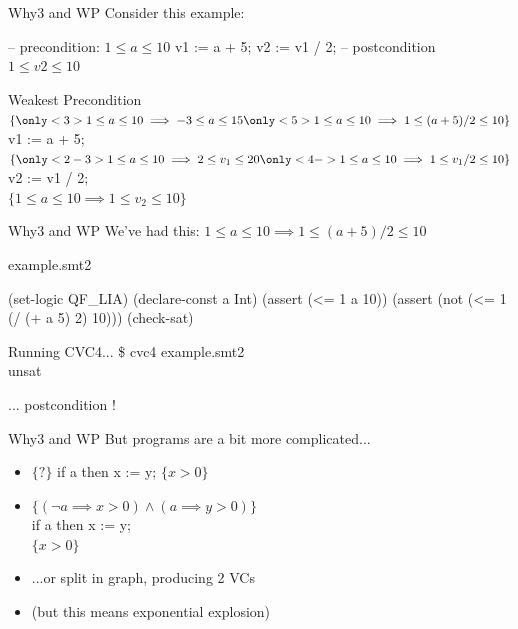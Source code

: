 \documentclass{beamer}
\begin{document}
\begin{frame}[fragile]{Why3 and WP}
  Consider this example:
  \begin{pxcode}[language=SPARK,gobble=4]
    -- precondition: $1 \leq a \leq 10$
    v1 := a + 5;
    v2 := v1 / 2;
    -- postcondition $1 \leq v2 \leq 10$
  \end{pxcode}

  \begin{block}{Weakest Precondition}
    $\{
    \only<3>{1 \leq a \leq 10 \implies -3 \leq a \leq 15}
    \only<5>{1 \leq a \leq 10 \implies 1 \leq (a + 5) / 2 \leq 10}
    \}$\\
    v1 := a + 5;\\
    $\{
    \only<2-3>{1 \leq a \leq 10 \implies 2 \leq v_1  \leq 20}
    \only<4->{1 \leq a \leq 10 \implies 1 \leq v_1 / 2 \leq 10}
    \}$\\
    v2 := v1 / 2;\\
    $\{
    1 \leq a \leq 10 \implies 1 \leq v_2 \leq 10
    \}$
  \end{block}
\end{frame}

\begin{frame}[fragile]{Why3 and WP}
  We've had this: $1 \leq a \leq 10 \implies 1 \leq (a + 5) / 2 \leq
  10$ \pause
  \begin{block}{example.smt2}
  \begin{pxcode}[language=SMTLIB,gobble=4]
    (set-logic QF_LIA)
    (declare-const a Int)
    (assert (<= 1 a 10))
    (assert (not (<= 1 (/ (+ a 5) 2) 10)))
    (check-sat)
  \end{pxcode}
  \end{block}
  \pause
  \begin{block}{Running CVC4...}
    \$ cvc4 example.smt2\\
    unsat
  \end{block}
  ... postcondition !
\end{frame}

\begin{frame}{Why3 and WP}
  But programs are a bit more complicated...
  \begin{itemize}
  \item $\{ ? \}$ if a then x := y; $\{ x > 0 \}$
  \pause
  \item $\{ (\lnot a \implies x > 0) \land (a \implies y > 0) \}$\\
    if a then x := y;\\
    $\{ x > 0 \}$
  \pause
  \item ...or split in graph, producing 2 VCs
  \item (but this means exponential explosion)
  \end{itemize}
\end{frame}
\end{document}
